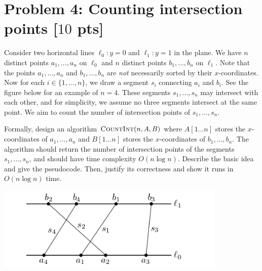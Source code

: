 \documentclass[letterpaper, 11pt]{article}
\newcommand{\1}{\mathds{1}}	%
\theoremstyle{definition}
\newcommand{\problem}[1]{\section*{Problem #1}}
\begin{document}
\problem{4: Counting intersection points [$10$ pts]}
Consider two horizontal lines $\ell_0: y = 0$ and $\ell_1:y = 1$ in the plane.
We have $n$ distinct points $a_1,\dots,a_n$ on $\ell_0$ and $n$ distinct points $b_1,\dots,b_n$ on $\ell_1$.
Note that the points $a_1,\dots,a_n$ and $b_1,\dots,b_n$ are \textit{not} necessarily sorted by their $x$-coordinates.
Now for each $i \in \{1,\dots,n\}$, we draw a segment $s_i$ connecting $a_i$ and $b_i$.
See the figure below for an example of $n = 4$.
These segments $s_1,\dots,s_n$ may intersect with each other, and for simplicity, we assume no three segments intersect at the same point.
We aim to count the number of intersection points of $s_1,\dots,s_n$.

Formally, design an algorithm $\textsc{CountInt}(n,A,B)$ where $A[1 \dots n]$ stores the $x$-coordinates of $a_1,\dots,a_n$ and $B[1 \dots n]$ stores the $x$-coordinates of $b_1,\dots,b_n$.
The algorithm should return the number of intersection points of the segments $s_1,\dots,s_n$, and should have time complexity $O(n \log n)$.
Describe the basic idea and give the pseudocode.
Then, justify its correctness and show it runs in $O(n \log n)$ time.

\begin{center}
    \includegraphics[height=4cm]{hw-fig-intersection.jpg}
\end{center}
\end{document}
